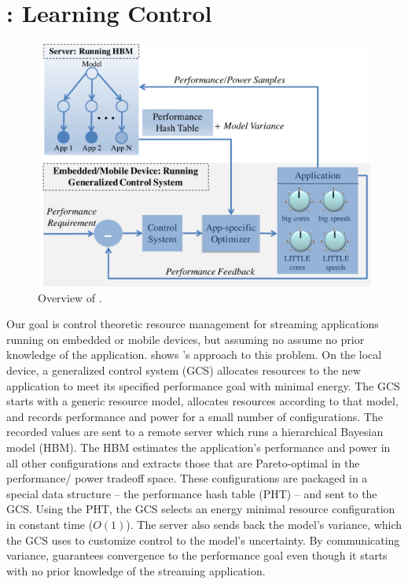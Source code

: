 \section{\SYSTEM{}: Learning Control}
\label{sec:framework}



\begin{figure}
\includegraphics[width=\columnwidth]{figures/ControlLearning2.pdf}
\caption{Overview of \SYSTEM{}.}
\label{fig:overview}
\end{figure}


Our goal is control theoretic resource management for streaming
applications running on embedded or mobile devices, but assuming no
assume no prior knowledge of the application.  
shows \SYSTEM{}'s approach to this problem.  On the local device, a
generalized control system (GCS) allocates resources to the new
application to meet its specified performance goal with minimal
energy.  The GCS starts with a generic resource model, allocates
resources according to that model, and records performance and power
for a small number of configurations.  The recorded values are sent to
a remote server which runs a hierarchical Bayesian model (HBM).  The
HBM estimates the application's performance and power in all other
configurations and extracts those that are Pareto-optimal in the
performance/ power tradeoff space.  These configurations are packaged
in a special data structure -- the performance hash table (PHT) -- and
sent to the GCS.  Using the PHT, the GCS selects an energy minimal
resource configuration in constant time ($O(1)$).  The server also
sends back the model's variance, which the GCS uses to customize
control to the model's uncertainty. By communicating variance,
\SYSTEM{} guarantees convergence to the performance goal even though
it starts with no prior knowledge of the streaming application.

